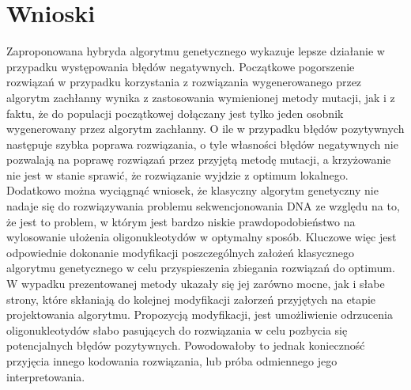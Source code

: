\documentclass{article}
\begin{document}
\section{Wnioski}
Zaproponowana hybryda algorytmu genetycznego wykazuje lepsze działanie w przypadku występowania błędów negatywnych. Początkowe pogorszenie rozwiązań w przypadku korzystania z rozwiązania wygenerowanego przez algorytm zachłanny wynika z zastosowania wymienionej metody mutacji, jak i z faktu, że do populacji początkowej dołączany jest tylko jeden osobnik wygenerowany przez algorytm zachłanny. O ile w przypadku błędów pozytywnych następuje szybka poprawa rozwiązania, o tyle własności błędów negatywnych nie pozwalają na poprawę rozwiązań przez przyjętą metodę mutacji, a krzyżowanie nie jest w stanie sprawić, że rozwiązanie wyjdzie z optimum lokalnego. Dodatkowo można wyciągnąć wniosek, że klasyczny algorytm genetyczny nie nadaje się do rozwiązywania problemu sekwencjonowania DNA ze względu na to, że jest to problem, w którym jest bardzo niskie prawdopodobieństwo na wylosowanie ułożenia oligonukleotydów w optymalny sposób. Kluczowe więc jest odpowiednie dokonanie modyfikacji poszczególnych  założeń klasycznego algorytmu genetycznego w celu przyspieszenia zbiegania rozwiązań do optimum. W wypadku prezentowanej metody ukazały się jej zarówno mocne, jak i słabe strony, które skłaniają do kolejnej modyfikacji załorzeń przyjętych na etapie projektowania algorytmu. Propozycją modyfikacji, jest umożliwienie odrzucenia oligonukleotydów słabo pasujących do rozwiązania w celu pozbycia się potencjalnych błędów pozytywnych. Powodowałoby to jednak konieczność przyjęcia innego kodowania rozwiązania, lub próba odmiennego jego interpretowania.
\end{document}
